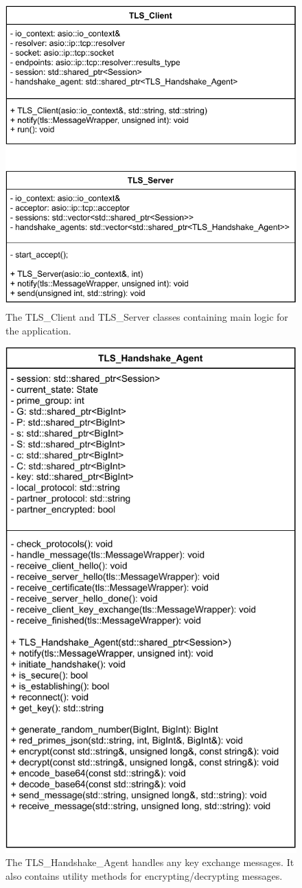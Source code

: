 \documentclass[12pt, letterpaper]{article}
\begin{document}
\begin{figure}[H]
	\centering
	\includegraphics[width=.7\textwidth]{UML/ClientServer}
	\caption{The TLS\_Client and TLS\_Server classes containing main logic for the application.}
	\label{fig:ClientServer}
\end{figure}

\begin{figure}[H]
	\centering
	\includegraphics[width=.7\textwidth]{UML/HandshakeAgent}
	\caption{The TLS\_Handshake\_Agent handles any key exchange messages. It also contains  utility methods for encrypting/decrypting messages.}
	\label{fig:HandshakeAgent}
\end{figure}
\end{document}
